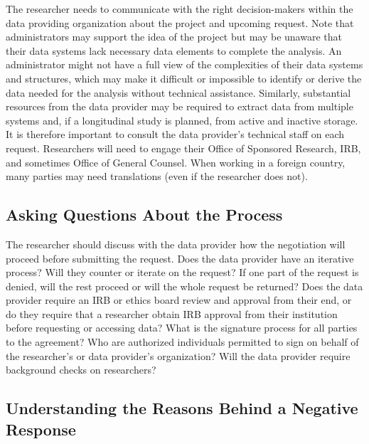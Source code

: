 The researcher needs to communicate with the right decision-makers within the data providing organization about the project and upcoming request. Note that administrators may support the idea of the project but may be unaware that their data systems lack necessary data elements to complete the analysis. An administrator might not have a full view of the complexities of their data systems and structures, which may make it difficult or impossible to identify or derive the data needed for the analysis without technical assistance. Similarly, substantial resources from the data provider may be required to extract data from multiple systems and, if a longitudinal study is planned, from active and inactive storage. It is therefore important to consult the data provider's technical staff on each request. Researchers will need to engage their Office of Sponsored Research, IRB, and sometimes Office of General Counsel. When working in a foreign country, many parties may need translations (even if the researcher does not).

\hypertarget{asking-questions-about-the-process}{%
\subsection{Asking Questions About the Process}\label{asking-questions-about-the-process}}

The researcher should discuss with the data provider how the negotiation will proceed before submitting the request. Does the data provider have an iterative process? Will they counter or iterate on the request? If one part of the request is denied, will the rest proceed or will the whole request be returned? Does the data provider require an IRB or ethics board review and approval from their end, or do they require that a researcher obtain IRB approval from their institution before requesting or accessing data? What is the signature process for all parties to the agreement? Who are authorized individuals permitted to sign on behalf of the researcher's or data provider's organization? Will the data provider require background checks on researchers?

\hypertarget{understanding-the-reasons-behind-a-negative-response}{%
\subsection{Understanding the Reasons Behind a Negative Response}\label{understanding-the-reasons-behind-a-negative-response}}

